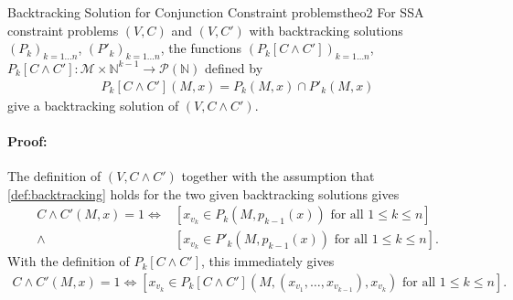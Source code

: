 \begin{theorem}{Backtracking Solution for Conjunction Constraint problems}{theo2}
    For SSA constraint problems $(V,C)$ and $(V,C')$ with backtracking
    solutions $(P_k)_{k=1\dots n}$, $(P'_k)_{k=1\dots n}$, the
    functions $(P_k[C\mathrel\land C'])_{k=1\dots n}$,
    $P_k[C\mathrel\land C']\colon\mathcal M\times\mathbb N^{k-1}\rightarrow\mathcal P(\mathbb N)$
    defined by
    \begin{align*}
        P_k[C\mathrel\land C'](M,x)=P_k(M,x)\mathrel\cap P'_k(M,x)
    \end{align*}
    give a backtracking solution of $(V,C\mathrel\land C')$.
    \tcblower
    \paragraph*{Proof:}
    The definition of $(V,C\mathrel\land C')$ together with the
    assumption that \autoref{def:backtracking} holds for the two given
    backtracking solutions gives
    \begin{align*}
        C\mathrel\land C'(M,x)=1\iff{}&\left[x_{v_k}\in P_k(M,p_{k-1}(x))\text{ for all }1\leq k\leq n\right]\\
                              \mathrel\land{}&\left[x_{v_k}\in P'_k(M,p_{k-1}(x))\text{ for all }1\leq k\leq n\right].
    \end{align*}
    With the definition of $P_k[C\mathrel\land C']$, this immediately gives
    \begin{align*}
        C\mathrel\land C'(M,x)=1\iff\left[x_{v_k}\in P_k[C\mathrel\land C'](M,(x_{v_1},\dots,x_{v_{k-1}}),x_{v_k})\text{ for all }1\leq k\leq n\right].
    \end{align*}
\end{theorem}
